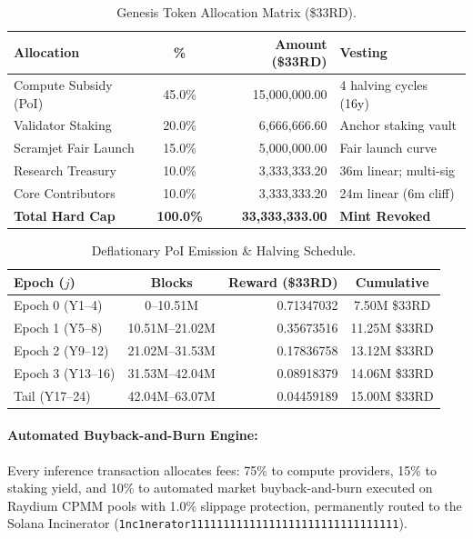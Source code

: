 \documentclass[10pt,twocolumn,letterpaper]{article}
\begin{document}
\begin{table}[htbp]
\centering
\small
\caption{Genesis Token Allocation Matrix (\$33RD).}
\label{tab:genesis_alloc}
\begin{tabularx}{\columnwidth}{lcrl}
\toprule
\textbf{Allocation} & \textbf{\%} & \textbf{Amount (\$33RD)} & \textbf{Vesting} \\
\midrule
Compute Subsidy (PoI) & 45.0\% & 15,000,000.00 & 4 halving cycles (16y) \\
Validator Staking & 20.0\% & 6,666,666.60 & Anchor staking vault \\
Scramjet Fair Launch & 15.0\% & 5,000,000.00 & Fair launch curve \\
Research Treasury & 10.0\% & 3,333,333.20 & 36m linear; multi-sig \\
Core Contributors & 10.0\% & 3,333,333.20 & 24m linear (6m cliff) \\
\midrule
\textbf{Total Hard Cap} & \textbf{100.0\%} & \textbf{33,333,333.00} & \textbf{Mint Revoked} \\
\bottomrule
\end{tabularx}
\end{table}

\begin{table}[htbp]
\centering
\small
\caption{Deflationary PoI Emission \& Halving Schedule.}
\label{tab:emission_sched}
\begin{tabularx}{\columnwidth}{lcrc}
\toprule
\textbf{Epoch ($j$)} & \textbf{Blocks} & \textbf{Reward (\$33RD)} & \textbf{Cumulative} \\
\midrule
Epoch 0 (Y1--4) & 0--10.51M & 0.71347032 & 7.50M \$33RD \\
Epoch 1 (Y5--8) & 10.51M--21.02M & 0.35673516 & 11.25M \$33RD \\
Epoch 2 (Y9--12) & 21.02M--31.53M & 0.17836758 & 13.12M \$33RD \\
Epoch 3 (Y13--16) & 31.53M--42.04M & 0.08918379 & 14.06M \$33RD \\
Tail (Y17--24) & 42.04M--63.07M & 0.04459189 & 15.00M \$33RD \\
\bottomrule
\end{tabularx}
\end{table}

\paragraph{Automated Buyback-and-Burn Engine:} Every inference transaction allocates fees: 75\% to compute providers, 15\% to staking yield, and 10\% to automated market buyback-and-burn executed on Raydium CPMM pools with 1.0\% slippage protection, permanently routed to the Solana Incinerator (\texttt{1nc1nerator11111111111111111111111111111111}).
\end{document}
